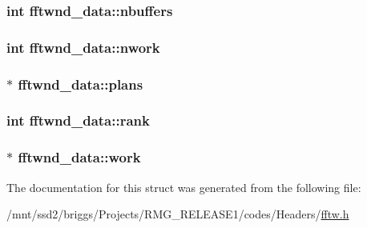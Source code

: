 \hypertarget{structfftwnd__data_a5d44d57b6fea0744dee38c0fe668c256}{
\subsubsection[{nbuffers}]{\setlength{\rightskip}{0pt plus 5cm}int fftwnd\-\_\-data\-::nbuffers}}\label{structfftwnd__data_a5d44d57b6fea0744dee38c0fe668c256}
\hypertarget{structfftwnd__data_a032d7302d54a092ed1ca74f6392d52b1}{
\subsubsection[{nwork}]{\setlength{\rightskip}{0pt plus 5cm}int fftwnd\-\_\-data\-::nwork}}\label{structfftwnd__data_a032d7302d54a092ed1ca74f6392d52b1}
\hypertarget{structfftwnd__data_ae4f62c58612bb6ee7b6b2b056f7fc0a2}{
\subsubsection[{plans}]{$\ast$ fftwnd\-\_\-data\-::plans}}\label{structfftwnd__data_ae4f62c58612bb6ee7b6b2b056f7fc0a2}
\hypertarget{structfftwnd__data_a45c88cd0e574357ba13a671a94ce6adb}{
\subsubsection[{rank}]{\setlength{\rightskip}{0pt plus 5cm}int fftwnd\-\_\-data\-::rank}}\label{structfftwnd__data_a45c88cd0e574357ba13a671a94ce6adb}
\hypertarget{structfftwnd__data_a5d41dc9033beffa4d941c3dae155a862}{
\subsubsection[{work}]{$\ast$ fftwnd\-\_\-data\-::work}}\label{structfftwnd__data_a5d41dc9033beffa4d941c3dae155a862}


The documentation for this struct was generated from the following file\-:\begin{DoxyCompactItemize}
\item 
/mnt/ssd2/briggs/\-Projects/\-R\-M\-G\-\_\-\-R\-E\-L\-E\-A\-S\-E1/codes/\-Headers/\hyperlink{fftw_8h}{fftw.\-h}\end{DoxyCompactItemize}
